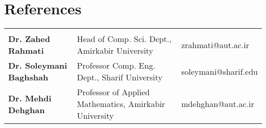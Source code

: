

\section{References}\vspace{-1.0em}

\begin{tabularx}{\textwidth} { 
		>{\raggedright\arraybackslash}l
		>{\centering}X
		>{\raggedleft\arraybackslash}l }
	\multicolumn{3}{c}{} \\	%
	\textbf{Dr. Zahed Rahmati} & 
	Head of Comp. Sci. Dept., Amirkabir University   & 
	zrahmati@aut.ac.ir \\ 
	
	\textbf{Dr. Soleymani Baghshah} & 
	Professor Comp. Eng. Dept., Sharif University   & 
	soleymani@sharif.edu \\ 
	
	\textbf{Dr. Mehdi Dehghan} &
	Professor of Applied Mathematics, Amirkabir University & 
	mdehghan@aut.ac.ir \\ 
	
	
\end{tabularx}